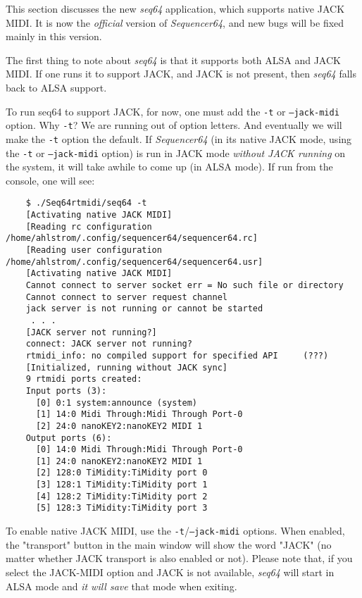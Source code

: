    This section discusses the new \textsl{seq64} application, which supports
   native JACK MIDI.  It is now the \textsl{official} version of
   \textsl{Sequencer64}, and new bugs will be fixed mainly in this version.

   The first thing to note about \textsl{seq64}
   is that it supports both ALSA and JACK
   MIDI.  If one runs it to support JACK, and JACK is not present, then
   \textsl{seq64}
   falls back to ALSA support.

   To run seq64 to support JACK, for now, one must add the
   \texttt{-t} or \texttt{--jack-midi}
   option.  Why \texttt{-t}?  We are running out of option letters.
   And eventually we will make the \texttt{-t} option the default.
   If \textsl{Sequencer64} (in its native JACK mode, using the
   \texttt{-t} or \texttt{--jack-midi} option)
   is run in JACK mode \textsl{without JACK running} on
   the system, it will take awhile to come up (in ALSA mode).  If run from the
   console, one will see:

\begin{verbatim}
	$ ./Seq64rtmidi/seq64 -t
	[Activating native JACK MIDI]
	[Reading rc configuration /home/ahlstrom/.config/sequencer64/sequencer64.rc]
	[Reading user configuration /home/ahlstrom/.config/sequencer64/sequencer64.usr]
	[Activating native JACK MIDI]
	Cannot connect to server socket err = No such file or directory
	Cannot connect to server request channel
	jack server is not running or cannot be started
     . . .
	[JACK server not running?]
	connect: JACK server not running?
	rtmidi_info: no compiled support for specified API     (???)
	[Initialized, running without JACK sync]
	9 rtmidi ports created:
	Input ports (3):
	  [0] 0:1 system:announce (system)
	  [1] 14:0 Midi Through:Midi Through Port-0
	  [2] 24:0 nanoKEY2:nanoKEY2 MIDI 1
	Output ports (6):
	  [0] 14:0 Midi Through:Midi Through Port-0 
	  [1] 24:0 nanoKEY2:nanoKEY2 MIDI 1 
	  [2] 128:0 TiMidity:TiMidity port 0 
	  [3] 128:1 TiMidity:TiMidity port 1 
	  [4] 128:2 TiMidity:TiMidity port 2 
	  [5] 128:3 TiMidity:TiMidity port 3 
\end{verbatim}

   To enable native JACK MIDI, use the
   \texttt{-t}/\texttt{--jack-midi} options.
   When enabled, the "transport" button in the main window will show the word
   "JACK" (no matter whether JACK transport is also enabled or not).
   Please note that, if you
   select the JACK-MIDI option and JACK is not available,
   \textsl{seq64} will start in
   ALSA mode and \textsl{it will save} that mode when exiting.


